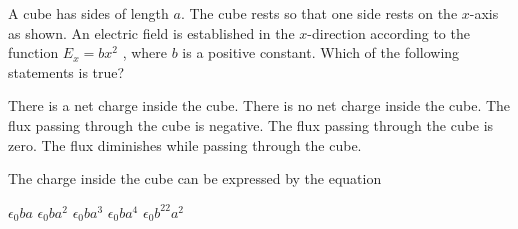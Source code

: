 \documentclass{../../oss-classkick-exam}
\begin{document}
\begin{multicols*}{2}
\begin{questions}
%    

    \question A cube has sides of length $a$. The cube rests so that one side
    rests on the $x$-axis as shown. An electric field is established in the
    $x$-direction according to the function $E_x=bx^2$ , where $b$ is a positive
    constant. Which of the following statements is true?
    \label{cube1}
    \begin{choices}
      \choice There is a net charge inside the cube.
      \choice There is no net charge inside the cube.
      \choice The flux passing through the cube is negative.
      \choice The flux passing through the cube is zero.
      \choice The flux diminishes while passing through the cube.
    \end{choices}
    \vspace{.7in}
    
    \question The charge inside the cube can be expressed by the equation
    \label{cube2}
    \begin{choices}
      \choice $\epsilon_0ba$
      \choice $\epsilon_0ba^2$
      \choice $\epsilon_0ba^3$
      \choice $\epsilon_0ba^4$
      \choice $\epsilon_0b^22a^2$
    \end{choices}
    \columnbreak
    

\end{questions}
\end{multicols*}
\end{document}
